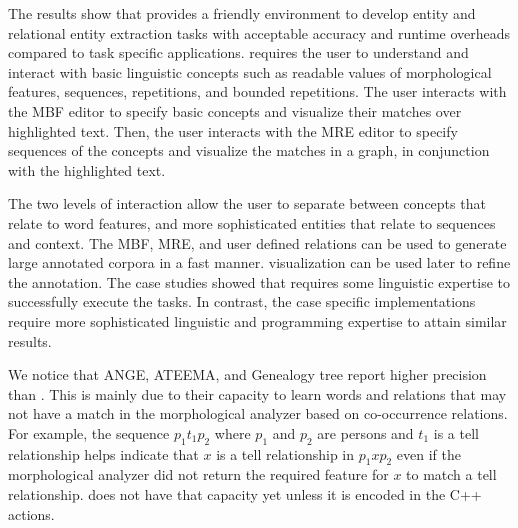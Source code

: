 The results show that \framework 
provides a friendly environment to develop entity and relational
entity extraction tasks with acceptable 
accuracy and runtime overheads compared to task specific applications. 
%
\framework requires the user to understand and interact with 
basic linguistic concepts such as readable values of morphological 
features, sequences, repetitions, and bounded repetitions. 
The user interacts with the MBF editor to specify basic concepts
and visualize their matches over highlighted text. 
%
Then, the user interacts with the MRE editor to specify 
sequences of the concepts and visualize the matches
in a graph, in conjunction with the highlighted text.

The two levels of interaction allow the user to separate between concepts 
that relate to word features, and more sophisticated entities 
that relate to sequences and context. 
%
The MBF, MRE, and user defined relations 
can be used to generate large annotated corpora in a fast manner. 
\framework visualization can be used later to refine the annotation.
%
The case studies showed that 
\framework requires some linguistic expertise to successfully execute the 
tasks.
In contrast, the case specific implementations require more sophisticated 
linguistic and programming expertise to attain similar results. 


We notice that ANGE, ATEEMA, and Genealogy tree report higher precision than \framework. 
This is mainly due to their capacity 
to learn words and relations that may not have a match in the 
morphological analyzer based on co-occurrence relations. 
For example, the sequence $p_1 t_1 p_2$ where $p_1$ and 
$p_2$ are persons and $t_1$ is a tell relationship helps
indicate that $x$ is a tell relationship in $p_1 x p_2$ 
even if the morphological analyzer did not return the required
feature for $x$ to match a tell relationship. 
\framework does not have that capacity yet unless it is
encoded in the C++ actions.

